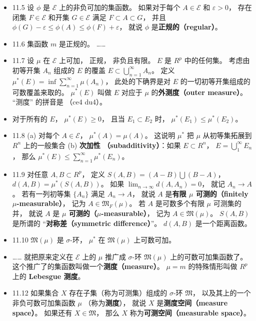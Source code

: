 \begin{itemize}
\item 11.5 设 $\phi$ 是 $\mathscr E$ 上的非负可加的集函数。 如果对于每个 $A\in \mathscr E$ 和 $\varepsilon>0$， 存在闭集 $F\in \mathscr E$ 和开集 $G\in\mathscr E$ 满足 $F\subset A\subset G$， 并且 $\phi(G)-\varepsilon \leqslant \phi(A) \leqslant \phi(F) + \varepsilon$， 就说 $\phi$ 是\textbf{正规的（regular）}。

\item 11.6 集函数 $m$ 是正规的。 ……

\item 11.7 设 $\mu$ 在 $\mathscr E$ 上可加， 正规， 非负且有限。 $E$ 是 $R^p$ 中的任何集。 考虑由初等开集 $A_n$ 组成的 $E$ 的覆盖 $E\subset \bigcup_{n=1}^\infty A_n$。 定义 $\mu^*(E) = \inf \sum_{n=1}^\infty \mu(A_n)$， 此处的下确界是对 $E$ 的一切初等开集组成的可数覆盖来取的。 $\mu^*(E)$ 叫做 $E$ 对应于 $\mu$ 的\textbf{外测度（outer measure）}。 “测度” 的拼音是 （ce4 du4）。

\item 对于所有的 $E$， $\mu^*(E)\geqslant 0$， 且当 $E_1\subset E_2$ 时， $\mu^*(E_1) \leqslant \mu^*(E_2)$。

\item 11.8 (a) 对每个 $A\in \mathscr E$， $\mu^*(A)=\mu(A)$。 这说明 $\mu^*$ 把 $\mu$ 从初等集拓展到 $R^n$ 上的一般集合 (b) \textbf{次加性 （subadditivity）}：如果 $E\subset R^n$， $E=\bigcup_1^\infty E_n$， 那么 $\mu^*(E)\leqslant \sum_{n=1}^\infty \mu^*(E_n)$。

\item 11.9 对任意 $A,B \subset R^p$， 定义 $S(A,B)=(A-B)\bigcup (B-A)$， $d(A,B)=\mu^*(S(A,B))$。 如果 $\lim_{n\to\infty} d(A,A_n)=0$， 就记 $A_n\to A$。 若有一列初等集 $\{A_n\}$ 满足 $A_n\to A$， 就说 $A$ 是\textbf{有限 $\mu$ 可测的（finitely $\mu$-measurable）}， 记为 $A\in \mathfrak M_F(\mu)$。 若 $A$ 是可数多个有限 $\mu$ 可测集的并， 就说 $A$ 是 \textbf{$\mu$ 可测的（$\mu$-measurable）}， 记为 $A\in \mathfrak M(\mu)$。 $S(A,B)$ 是所谓的 “\textbf{对称差（symmetric difference）}”。 $d(A,B)$ 是一个距离函数。

\item 11.10 $\mathfrak M(\mu)$ 是 $\sigma$-环， $\mu^*$ 在 $\mathfrak M(\mu)$ 上可数可加。

\item …… 就把原来定义在 $\mathscr E$ 上的 $\mu$ 推广成 $\sigma$-环 $\mathfrak M(\mu)$ 上的可数可加集函数了。 这个推广了的集函数叫做一个\textbf{测度（measure）}。 $\mu=m$ 的特殊情形叫做 $R^p$ 上的 \textbf{Lebesgue 测度}。

\item 11.12 如果集合 $X$ 存在子集（称为可测集）组成的 $\sigma$-环 $\mathfrak M$， 以及其上的一个非负可数可加集函数 $\mu$ （称为\textbf{测度}）， 就说 $X$ 是\textbf{测度空间（measure space）}。 如果还有 $X\in \mathfrak M$， 那么 $X$ 称为\textbf{可测空间（measurable space）}。


\end{itemize}
